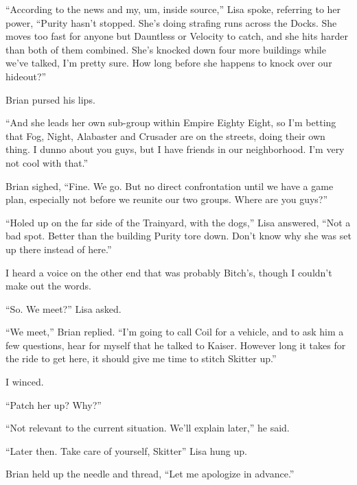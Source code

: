 ``According to the news and my, um, inside source,''  Lisa spoke, referring to her power, ``Purity hasn't stopped.  She's doing strafing runs across the Docks.  She moves too fast for anyone but Dauntless or Velocity to catch, and she hits harder than both of them combined.  She's knocked down four more buildings while we've talked, I'm pretty sure. How long before she happens to knock over our hideout?''



Brian pursed his lips.



``And she leads her own sub-group within Empire Eighty Eight, so I'm betting that Fog, Night, Alabaster and Crusader are on the streets, doing their own thing.  I dunno about you guys, but I have friends in our neighborhood.  I'm very not cool with that.''



Brian sighed, ``Fine.  We go.  But no direct confrontation until we have a game plan, especially not before we reunite our two groups.  Where are you guys?''



``Holed up on the far side of the Trainyard, with the dogs,'' Lisa answered, ``Not a bad spot.  Better than the building Purity tore down.  Don't know why she was set up there instead of here.''



I heard a voice on the other end that was probably Bitch's, though I couldn't make out the words.



``So.  We meet?'' Lisa asked.



``We meet,'' Brian replied.  ``I'm going to call Coil for a vehicle, and to ask him a few questions, hear for myself that he talked to Kaiser.  However long it takes for the ride to get here, it should give me time to stitch Skitter up.''



I winced.



``Patch her up?  Why?''



``Not relevant to the current situation.  We'll explain later,'' he said.



``Later then.  Take care of yourself, Skitter''  Lisa hung up.



Brian held up the needle and thread, ``Let me apologize in advance.''



